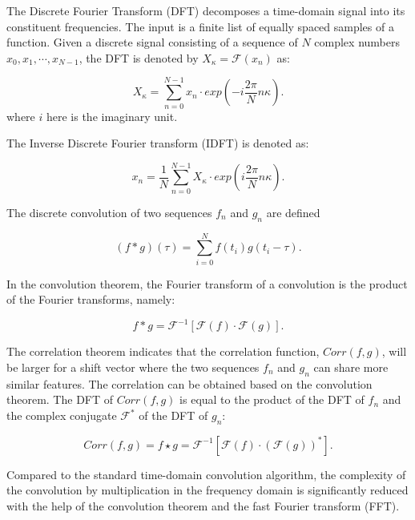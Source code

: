 \documentclass[letterpaper, 10 pt, conference]{ieeeconf}  %
\begin{document}
The Discrete Fourier Transform (DFT) decomposes a time-domain signal into its constituent frequencies. The input is a finite list of equally spaced samples of a function. Given a discrete signal consisting of a sequence of $N$ complex numbers $x_{0},x_{1},\cdots,x_{N-1}$, the DFT is denoted by $X_{\kappa} = \mathcal{F}({x_{n}})$ as:

\begin{equation}\label{equ24}
    X_{\kappa} = \sum_{n=0}^{N-1}x_{n}\cdot exp(-i\frac{2\pi}{N}n\kappa).
\end{equation}
where $i$ here is the imaginary unit.

The Inverse Discrete Fourier transform (IDFT) is denoted as:

\begin{equation}\label{equ25}
    x_{n} = \frac{1}{N}\sum_{n=0}^{N-1}X_{\kappa}\cdot exp(i\frac{2\pi}{N}n\kappa).
\end{equation}

The discrete convolution of two sequences $f_{n}$ and $g_{n}$  are defined

\begin{equation}\label{equ26}
    (f \ast g)(\tau)=\sum_{i=0}^{N}f(t_{i})g(t_{i}-\tau).
\end{equation}

In the convolution theorem, the Fourier transform of a convolution is the product of the Fourier transforms, namely:

\begin{equation}\label{equ27}
    f \ast g = \mathcal{F}^{-1} [\mathcal{F}(f) \cdot \mathcal{F}(g)].
\end{equation}

The correlation theorem indicates that the correlation function, $Corr(f,g)$, will be larger for a shift vector where the two sequences $f_n$ and $g_n$ can share more similar features. The correlation can be obtained based on the convolution theorem. The DFT of $Corr(f,g)$ is equal to the product of the DFT of $f_{n}$ and the complex conjugate $\mathcal{F}^{*}$ of the DFT of $g_n$:

\begin{equation}\label{equ28}
    Corr(f,g)=f \star g = \mathcal{F}^{-1}[\mathcal{F}(f) \cdot (\mathcal{F}(g))^{*}].
\end{equation}

Compared to the standard time-domain convolution algorithm, the complexity of the convolution by multiplication in the frequency domain is significantly reduced with the help of the convolution theorem and the fast Fourier transform (FFT).
\end{document}
